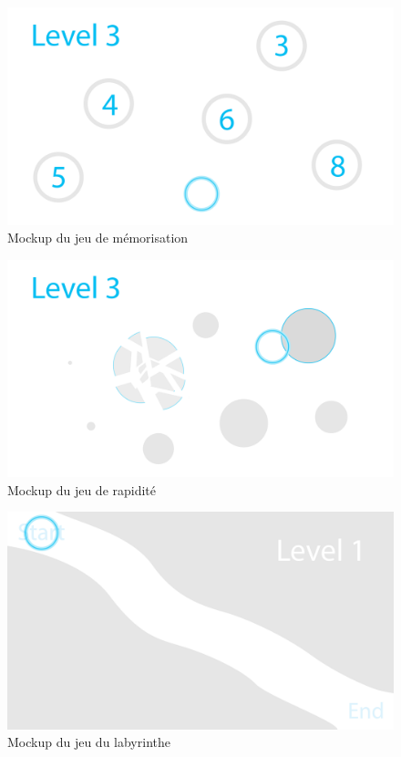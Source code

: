 \documentclass{polytech/polytech}
\begin{document}
\begin{figure}
    \centering
    \includegraphics[width=15cm]{img/mockups/Remember(LvL3).png}
    \caption{Mockup du jeu de mémorisation}
    \label{fig:mockup_memo}
\end{figure}

\begin{figure}
    \centering
    \includegraphics[width=15cm]{img/mockups/RapideEyeMovement.png}
    \caption{Mockup du jeu de rapidité}
    \label{fig:mockup_fast}
\end{figure}

\begin{figure}
    \centering
    \includegraphics[width=15cm]{img/mockups/Maze.png}
    \caption{Mockup du jeu du labyrinthe}
    \label{fig:mockup_maze}
\end{figure}
\end{document}
